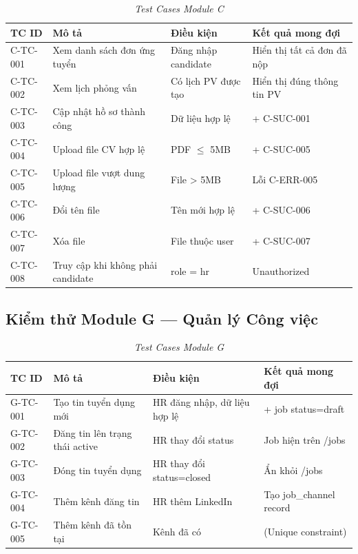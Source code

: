 \begin{table}[H]
    \centering
    \small
    \renewcommand{\arraystretch}{1.3}
    \begin{tabularx}{\textwidth}{|>{\centering\arraybackslash}p{2.2cm}|>{\raggedright\arraybackslash}X|>{\raggedright\arraybackslash}X|>{\raggedright\arraybackslash}X|}
        \hline
        \textbf{TC ID} & \textbf{Mô tả} & \textbf{Điều kiện} & \textbf{Kết quả mong đợi} \\ \hline
        C-TC-001 & Xem danh sách đơn ứng tuyển & Đăng nhập candidate & Hiển thị tất cả đơn đã nộp \\ \hline
        C-TC-002 & Xem lịch phỏng vấn & Có lịch PV được tạo & Hiển thị đúng thông tin PV \\ \hline
        C-TC-003 & Cập nhật hồ sơ thành công & Dữ liệu hợp lệ & 200 + C-SUC-001 \\ \hline
        C-TC-004 & Upload file CV hợp lệ & PDF $\leq$ 5MB & 201 + C-SUC-005 \\ \hline
        C-TC-005 & Upload file vượt dung lượng & File > 5MB & Lỗi C-ERR-005 \\ \hline
        C-TC-006 & Đổi tên file & Tên mới hợp lệ & 200 + C-SUC-006 \\ \hline
        C-TC-007 & Xóa file & File thuộc user & 200 + C-SUC-007 \\ \hline
        C-TC-008 & Truy cập khi không phải candidate & role = hr & 401 Unauthorized \\ \hline
    \end{tabularx}
    \caption{\textit{Test Cases Module C}}
\end{table}

\subsection{Kiểm thử Module G — Quản lý Công việc}

\begin{table}[H]
    \centering
    \small
    \renewcommand{\arraystretch}{1.3}
    \begin{tabularx}{\textwidth}{|>{\centering\arraybackslash}p{2.2cm}|>{\raggedright\arraybackslash}X|>{\raggedright\arraybackslash}X|>{\raggedright\arraybackslash}X|}
        \hline
        \textbf{TC ID} & \textbf{Mô tả} & \textbf{Điều kiện} & \textbf{Kết quả mong đợi} \\ \hline
        G-TC-001 & Tạo tin tuyển dụng mới & HR đăng nhập, dữ liệu hợp lệ & 201 + job status=draft \\ \hline
        G-TC-002 & Đăng tin lên trạng thái active & HR thay đổi status & Job hiện trên /jobs \\ \hline
        G-TC-003 & Đóng tin tuyển dụng & HR thay đổi status=closed & Ẩn khỏi /jobs \\ \hline
        G-TC-004 & Thêm kênh đăng tin & HR thêm LinkedIn & Tạo job\_channel record \\ \hline
        G-TC-005 & Thêm kênh đã tồn tại & Kênh đã có & 409 (Unique constraint) \\ \hline
    \end{tabularx}
    \caption{\textit{Test Cases Module G}}
\end{table}

